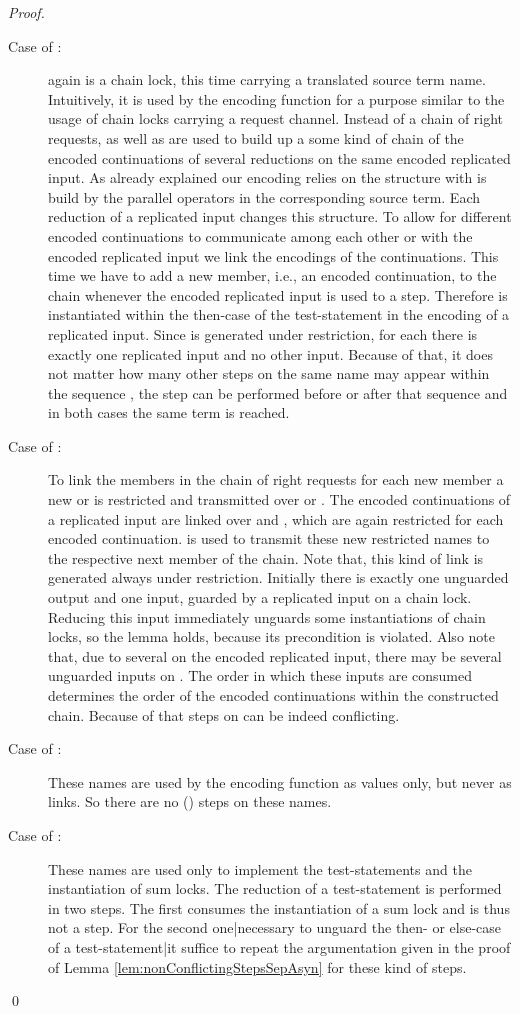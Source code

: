 \documentclass[]{llncs}
\begin{document}
\begin{proof}
\begin{description}
		\item[Case of :]  again is a chain lock, this time carrying a translated source term name. Intuitively, it is used by the encoding function for a purpose similar to the usage of chain locks carrying a request channel. Instead of a chain of right requests,  as well as  are used to build up a some kind of chain of the encoded continuations of several reductions on the same encoded replicated input. As already explained our encoding  relies on the structure with is build by the parallel operators in the corresponding source term. Each reduction of a replicated input changes this structure. To allow for different encoded continuations to communicate among each other or with the encoded replicated input we link the encodings of the continuations. This time we have to add a new member, i.e., an encoded continuation, to the chain whenever the encoded replicated input is used to \simulate a step. Therefore  is instantiated within the then-case of the test-statement in the encoding of a replicated input. Since  is generated under restriction, for each  there is exactly one replicated input and no other input. Because of that, it does not matter how many other steps on the same name may appear within the sequence , the step  can be performed before or after that sequence and in both cases the same term  is reached.
		\item[Case of :] To link the members in the chain of right requests for each new member a new  or  is restricted and transmitted over  or . The encoded continuations of a replicated input are linked over  and , which are again restricted for each encoded continuation.  is used to transmit these new restricted names to the respective next member of the chain. Note that, this kind of link is generated always under restriction. Initially there is exactly one unguarded output and one input, guarded by a replicated input on a chain lock. Reducing this input immediately unguards some instantiations of chain locks, so the lemma holds, because its precondition is violated. Also note that, due to several \simulations on the encoded replicated input, there may be several unguarded inputs on . The order in which these inputs are consumed determines the order of the encoded continuations within the constructed chain. Because of that steps on  can be indeed conflicting.
		\item[Case of :] These names are used by the encoding function as values only, but never as links. So there are no (\pure \admin) steps on these names.
		\item[Case of :] These names are used only to implement the test-statements and the instantiation of sum locks. The reduction of a test-statement is performed in two steps. The first consumes the instantiation of a sum lock and is thus not a \pure \admin step. For the second one|necessary to unguard the then- or else-case of a test-statement|it suffice to repeat the argumentation given in the proof of Lemma \ref{lem:nonConflictingStepsSepAsyn} for these kind of steps.
	\end{description}
	\qed
\end{proof}
\end{document}

